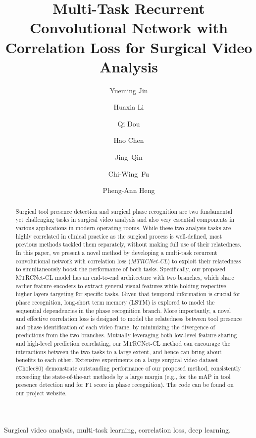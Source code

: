 \documentclass{elsarticle}
\begin{document}
\begin{frontmatter}

\title{Multi-Task Recurrent Convolutional Network with Correlation Loss for Surgical Video Analysis}


\author[firstadd]{Yueming Jin}
\author[firstadd]{Huaxia Li}
\author[firstadd]{Qi Dou}
\author[firstadd,senadd]{Hao Chen}
\author[thirdadd]{Jing~Qin}
\author[firstadd]{Chi-Wing~Fu}
\author[firstadd]{Pheng-Ann Heng}
\address[firstadd]{Department of Computer Science and Engineering, The Chinese University of Hong Kong}
\address[senadd]{Imsight Medical Technology, Co, Ltd, China}
\address[thirdadd]{Centre for Smart Health, School of Nursing, The Hong Kong Polytechnic University}



\begin{abstract}
Surgical tool presence detection and surgical phase recognition are two fundamental yet challenging tasks in surgical video analysis and also very essential components in various applications in modern operating rooms. While these two analysis tasks are highly correlated in clinical practice as the surgical process is well-defined, most previous methods tackled them separately, without making full use of their relatedness. In this paper, we present a novel method by developing a multi-task recurrent convolutional network with correlation loss (\emph{MTRCNet-CL}) to exploit their relatedness to simultaneously boost the performance of both tasks. Specifically, our proposed MTRCNet-CL model has an end-to-end architecture with two branches, which share earlier feature encoders to extract general visual features while holding respective higher layers targeting for specific tasks. Given that temporal information is crucial for phase recognition, long-short term memory (LSTM) is explored to model the sequential dependencies in the phase recognition branch. More importantly, a novel and effective correlation loss is designed to model the relatedness between tool presence and phase identification of each video frame, by minimizing the divergence of predictions from the two branches. Mutually leveraging both low-level feature sharing and high-level prediction correlating, our MTRCNet-CL method can encourage the interactions between the two tasks to a large extent, and hence can bring about benefits to each other. Extensive experiments on a large surgical video dataset (Cholec80) demonstrate outstanding performance of our proposed method, consistently exceeding the state-of-the-art methods by a large margin (e.g.,  for the mAP in tool presence detection and  for F1 score in phase recognition). The code can be found on our project website.



\end{abstract}

\begin{keyword}
Surgical video analysis, multi-task learning, correlation loss, deep learning.
\end{keyword}

\end{frontmatter}
\end{document}
